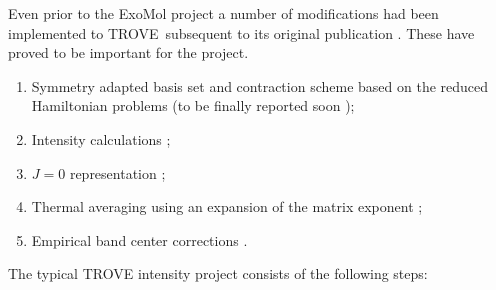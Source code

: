 \documentclass[12pt]{article}
\newcommand{\trove}{{\sc TROVE}}
\newcommand{\2}{$_{2}$}
\newcommand{\3}{$_{3}$}
\newcommand{\4}{$_{4}$}
\begin{document}
Even prior to the ExoMol project a number of modifications had been
implemented to \trove\ subsequent to its original publication \cite{TROVE}.
These have proved to be important for the project.
\begin{enumerate}
  \item Symmetry adapted basis set and contraction scheme based on the reduced Hamiltonian problems  (to be finally reported soon \cite{16YuYaxx.method});
  \item Intensity calculations \cite{09YuBaYa.NH3};
  \item $J=0$ representation \cite{09YuBaYa.NH3};
  \item Thermal averaging using an expansion of the matrix exponent \cite{10YaYuPa.NH3};
  \item Empirical band center corrections \cite{09YuBaYa.NH3}.
\end{enumerate}


 The typical TROVE intensity project consists of the following steps:
\end{document}
